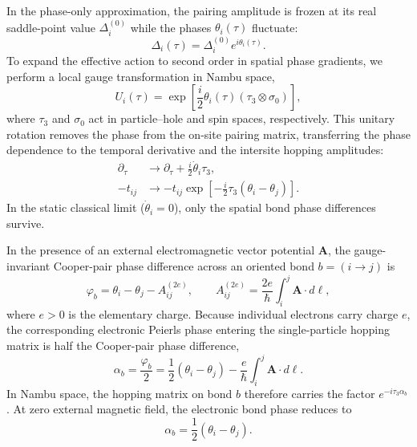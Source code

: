 \documentclass[aps,prb,twocolumn,superscriptaddress,floatfix]{revtex4-2}
\begin{document}
In the phase-only approximation, the pairing amplitude is frozen at its real saddle-point value $\Delta_i^{(0)}$ while the phases $\theta_i(\tau)$ fluctuate:
\begin{equation}
\Delta_i(\tau) = \Delta_i^{(0)} e^{i\theta_i(\tau)}.
\label{eq:A15}
\end{equation}
To expand the effective action to second order in spatial phase gradients, we perform a local gauge transformation in Nambu space,
\begin{equation}
U_i(\tau) = \exp\left[ \frac{i}{2}\theta_i(\tau)(\tau_3 \otimes \sigma_0) \right],
\label{eq:A16}
\end{equation}
where $\tau_3$ and $\sigma_0$ act in particle--hole and spin spaces, respectively. This unitary rotation removes the phase from the on-site pairing matrix, transferring the phase dependence to the temporal derivative and the intersite hopping amplitudes:
\begin{align}
\partial_\tau &\longrightarrow \partial_\tau + \frac{i}{2}\dot{\theta}_i \tau_3, \label{eq:A17} \\
-t_{ij} &\longrightarrow -t_{ij} \exp\left[ -\frac{i}{2}\tau_3(\theta_i - \theta_j) \right]. \label{eq:A18}
\end{align}
In the static classical limit ($\dot{\theta}_i = 0$), only the spatial bond phase differences survive.

In the presence of an external electromagnetic vector potential $\bm{A}$, the gauge-invariant Cooper-pair phase difference across an oriented bond $b = (i \to j)$ is
\begin{equation}
\varphi_b = \theta_i - \theta_j - A_{ij}^{(2e)}, \qquad A_{ij}^{(2e)} = \frac{2e}{\hbar}\int_i^j \bm{A}\cdot d\bm{\ell},
\label{eq:A19}
\end{equation}
where $e > 0$ is the elementary charge. Because individual electrons carry charge $e$, the corresponding electronic Peierls phase entering the single-particle hopping matrix is half the Cooper-pair phase difference,
\begin{equation}
\alpha_b = \frac{\varphi_b}{2} = \frac{1}{2}(\theta_i - \theta_j) - \frac{e}{\hbar}\int_i^j \bm{A}\cdot d\bm{\ell}.
\label{eq:A20}
\end{equation}
In Nambu space, the hopping matrix on bond $b$ therefore carries the factor $e^{-i\tau_3 \alpha_b}$. At zero external magnetic field, the electronic bond phase reduces to
\begin{equation}
\alpha_b = \frac{1}{2}(\theta_i - \theta_j).
\label{eq:A21}
\end{equation}
\end{document}
